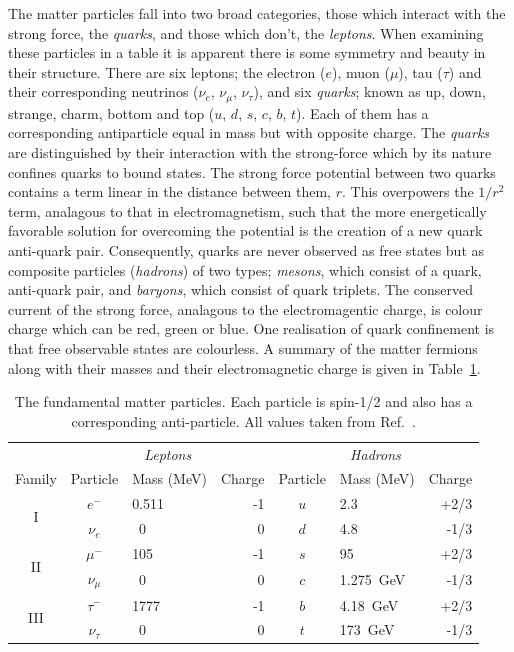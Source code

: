 The matter particles fall into two broad categories, those which interact with the strong force, the \textit{quarks}, and those which don't, the \textit{leptons}. When examining these particles in a table it is apparent there is some symmetry and beauty in their structure. There are six leptons; the electron ($e$), muon ($\mu$), tau ($\tau$) and their corresponding neutrinos ($\nu_{e}$, $\nu_{\mu}$, $\nu_{\tau}$), and six \textit{quarks}; known as up, down, strange, charm, bottom and top ($u$, $d$, $s$, $c$, $b$, $t$). Each of them has a corresponding antiparticle equal in mass but with opposite charge. The \textit{quarks} are distinguished by their interaction with the strong-force which by its nature confines quarks to bound states. The strong force potential between two quarks contains a term linear in the distance between them, $r$. This overpowers the $1/r^{2}$ term, analagous to that in electromagnetism, such that the more energetically favorable solution for overcoming the potential is the creation of a new quark anti-quark pair. Consequently, quarks are never observed as free states but as composite particles (\textit{hadrons}) of two types; \textit{mesons}, which consist of a quark, anti-quark pair, and \textit{baryons}, which consist of quark triplets. The conserved current of the strong force, analagous to the electromagentic charge, is colour charge which can be red, green or blue. One realisation of quark confinement is that free observable states are colourless. A summary of the matter fermions along with their masses and their electromagnetic charge is given in Table~\ref{tab:particles}.

\begin{table}[htb]
  \begin{tabular}{c | c l r | c l r }
  & \multicolumn{3}{c}{\textit{Leptons}} & \multicolumn{3}{c}{\textit{Hadrons}} \\
  Family & Particle      & Mass (MeV)  & Charge &  Particle      & Mass (MeV)  & Charge   \\
  \hline
  \multirow{2}{*}{I}    & $e^{-}$       & 0.511       & -1     &  $u$           & 2.3       & +2/3      \\
                        & $\nu_{e}$     & ~0          & 0      &  $d$           & 4.8         & -1/3       \\
  \multirow{2}{*}{II}   & $\mu^{-}$     & 105         & -1     &  $s$           & 95         & +2/3      \\
                        & $\nu_{\mu}$   & ~0          & 0      &  $c$           & 1.275~GeV          & -1/3       \\
  \multirow{2}{*}{III}  & $\tau^{-}$    & 1777        & -1     &  $b$           & 4.18~GeV        & +2/3      \\
                        & $\nu_{\tau}$  & ~0          & 0      &  $t$           & 173~GeV          & -1/3       \\
  \end{tabular}
  \caption{The fundamental matter particles. Each particle is spin-1/2 and also has a corresponding anti-particle. All values taken from Ref.~\cite{pdg}.}
  \label{tab:particles}
\end{table}

